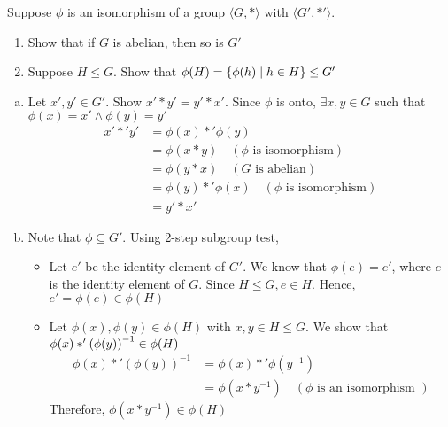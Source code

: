 \begin{exercise}
    Suppose $\phi$ is an isomorphism of a group $\langle G, \ast \rangle$ with $\langle G', \ast' \rangle$.
    \begin{enumerate}
        \item Show that if $G$ is abelian, then so is $G'$
        \item Suppose $H \leq G$. Show that $\phi (H) = \qty{\phi (h) \mid h \in H} \leq G'$
    \end{enumerate}
\end{exercise}
 
\begin{solution} \phantom{blank}
    \begin{enumerate}[(a)]
        \item  Let $x', y' \in G'$. Show $x' \ast y' = y' \ast x'$. Since $\phi$ is onto, $\exists x, y \in G$ such that $\phi(x) = x' \land \phi(y) = y'$
        \begin{align*}
            x' \ast' y' &= \phi(x) \ast' \phi(y) \\
            &= \phi(x \ast y) \hspace{1em} (\phi \text{ is isomorphism})\\
            &= \phi(y \ast x) \hspace{1em} (G \text{ is abelian}) \\
            &= \phi(y) \ast' \phi(x) \hspace{1em} (\phi \text{ is isomorphism}) \\
            &= y' \ast x'
        \end{align*}
        \item Note that $\phi \subseteq G'$. Using 2-step subgroup test, 
            \begin{itemize}
                \item Let $e'$  be the identity element of $G'$. We know that $\phi(e) = e'$, where $e$ is the identity element of $G$. Since $H \leq G, e \in H$. Hence, $e' = \phi(e) \in \phi(H)$
                \item Let $\phi(x), \phi(y) \in \phi(H)$ with $x, y \in H \leq G$. We show that $\phi(x) \ast' \qty(\phi(y))^{-1} \in \phi(H)$
                \begin{align*}
                    \phi(x) \ast' (\phi(y))^{-1} &= \phi(x) \ast' \phi(y^{-1}) \\
                    &= \phi(x \ast y^{-1}) \hspace{1em} (\phi \text{ is an isomorphism  })
                \end{align*}
                Therefore, $\phi(x \ast y^{-1}) \in \phi(H)$
            \end{itemize}
    \end{enumerate}
\end{solution}


